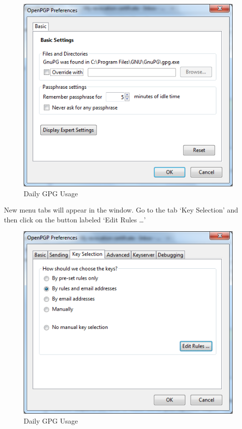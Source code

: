 \begin{figure}[htbp]
\centering
\includegraphics{daily_gpg_24.png}
\caption{Daily GPG Usage}
\end{figure}

New menu tabs will appear in the window. Go to the tab `Key Selection'
and then click on the button labeled `Edit Rules \ldots{}'

\begin{figure}[htbp]
\centering
\includegraphics{daily_gpg_25.png}
\caption{Daily GPG Usage}
\end{figure}

